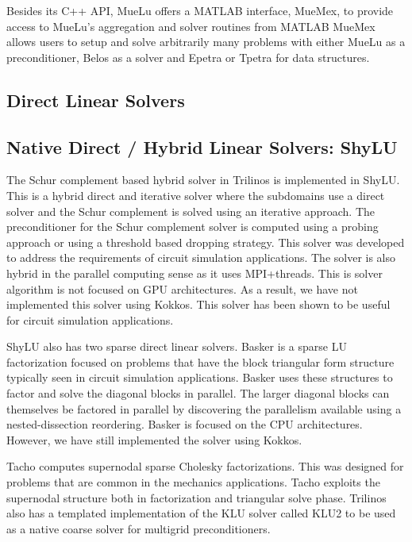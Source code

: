 Besides its C++ API, MueLu offers a MATLAB interface, MueMex, to provide access to MueLu's aggregation and solver routines from MATLAB
MueMex allows users to setup and solve arbitrarily many problems with either MueLu as a preconditioner, Belos as a solver and Epetra or Tpetra for data structures.


\subsection{Direct Linear Solvers}


\subsection{Native Direct / Hybrid Linear Solvers: ShyLU}
 The Schur complement based hybrid solver in Trilinos is implemented in ShyLU. This is a hybrid direct and iterative solver where the subdomains use a direct solver and the Schur complement is solved using an iterative approach. The preconditioner for the Schur complement solver is computed using a probing approach or using a threshold based dropping strategy. This solver was developed to address the requirements of circuit simulation applications. The solver is also hybrid in the parallel computing sense as it uses MPI+threads. This is solver algorithm is not focused on GPU architectures. As a result, we have not implemented this solver using Kokkos. This solver has been shown to be useful for circuit simulation applications.

 ShyLU also has two sparse direct linear solvers. Basker is a sparse LU factorization focused on problems that have the block triangular form structure typically seen in circuit simulation applications. Basker uses these structures to factor and solve the diagonal blocks in parallel. The larger diagonal blocks can themselves be factored in parallel by discovering the parallelism available using a nested-dissection reordering. Basker is focused on the CPU architectures. However, we have still implemented the solver using Kokkos. 

 Tacho computes supernodal sparse Cholesky factorizations. This was designed for problems that are common in the mechanics applications. Tacho exploits the supernodal structure both in factorization and triangular solve phase.  Trilinos also has a templated implementation of the KLU solver called KLU2 to be used as a native coarse solver for multigrid preconditioners.

